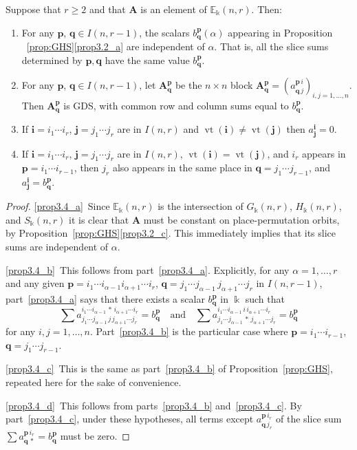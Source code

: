 \documentclass[ALCO,ThmDefs,Unicode,epreuves]{cedram}
\DeclareMathOperator{\vt}{vt}
\newcommand{\E}{\mathbb{E}}
\newcommand{\bi}{{\boldsymbol{i}}} %
\newcommand{\bj}{{\boldsymbol{j}}}
\newcommand{\bp}{{\boldsymbol{p}}}
\newcommand{\bq}{{\boldsymbol{q}}}
\newcommand{\qand}{\quad\text{and}\quad}
\newcommand{\bA}{\mathbf{A}}
\begin{document}
\begin{prop}\label{prop:inv-properties}
 Suppose that $r \ge 2$ and that $\bA$ is an element of
 $\E_\Bbbk(n,r)$. Then:
 \begin{enumerate}[label=(\alph*)]
 \item\label{prop3.4_a} For any $\bp$, $\bq \in I(n,r-1)$, the scalars
 $b^\bp_\bq(\alpha)$ appearing in Proposition
~\ref{prop:GHS}\ref{prop3.2_a} are
 independent of $\alpha$. That is, all the slice sums determined by
 $\bp, \bq$ have the same value $b^\bp_\bq$.
 \item\label{prop3.4_b} For any $\bp$, $\bq \in I(n,r-1)$, let $\bA^\bp_\bq$ be the $n
 \times n$ block $\bA^\bp_\bq = (a^{\bp\, i}_{\bq\, j})_{i,j = 1,
 \dots, n}$. Then $\bA^\bp_\bq$ is GDS, with common row and
 column sums equal to $b^\bp_\bq$.
 \item\label{prop3.4_c} If $\bi = i_1 \cdots i_r$, $\bj = j_1 \cdots j_r$ are in
 $I(n,r)$ and $\vt(\bi) \ne \vt(\bj)$ then $a^\bi_\bj = 0$.
 \item\label{prop3.4_d} If $\bi = i_1 \cdots i_r$, $\bj = j_1 \cdots j_r$ are in
 $I(n,r)$, $\vt(\bi) = \vt(\bj)$, and $i_r$ appears in $\bp = i_1
 \cdots i_{r-1}$, then $j_r$ also appears in the same place in $\bq
 = j_1 \cdots j_{r-1}$, and $a^\bi_\bj = b^\bp_\bq$.
 \end{enumerate}
\end{prop}

\begin{proof}
\ref{prop3.4_a}~Since $\E_\Bbbk(n,r)$ is the intersection of $G_\Bbbk(n,r)$,
$H_\Bbbk(n,r)$, and $S_\Bbbk(n,r)$ it is clear that $\bA$ must be
constant on place-permutation orbits, by Proposition~\ref{prop:GHS}\ref{prop3.2_c}. This immediately implies that its slice sums are
independent of $\alpha$.

\ref{prop3.4_b}~This follows from part~\ref{prop3.4_a}. Explicitly, for any $\alpha = 1,
\dots, r$ and any given $\bp = i_1 \cdots i_{\alpha-1} i_{\alpha+1}
\cdots i_r$, $\bq = j_1 \cdots j_{\alpha-1} \, j_{\alpha+1} \cdots
j_r$ in $I(n,r-1)$, part~\ref{prop3.4_a} says that there exists a scalar
$b^\bp_\bq$ in $\Bbbk$ such that
\[
\sum a^{i_1\cdots i_{\alpha-1} \,*\, i_{\alpha+1}\cdots
 i_r}_{j_1\cdots j_{\alpha-1} \, j \, j_{\alpha+1}\cdots j_r} =
b^\bp_\bq \qand \sum a^{i_1\cdots i_{\alpha-1} \, i \,
 i_{\alpha+1}\cdots i_r}_{j_1\cdots j_{\alpha-1} \,*\,
 j_{\alpha+1}\cdots j_r} = b^\bp_\bq
\]
for any $i,j = 1, \dots, n$. Part~\ref{prop3.4_b} is the particular case where
$\bp = i_1 \cdots i_{r-1}$, $\bq = j_1 \cdots j_{r-1}$.

\ref{prop3.4_c}~This is the same as part~\ref{prop3.4_b} of Proposition~\ref{prop:GHS}, repeated
here for the sake of convenience.

\ref{prop3.4_d}~This follows from parts~\ref{prop3.4_b} and~\ref{prop3.4_c}. By part~\ref{prop3.4_c}, under these hypotheses, all terms except $a^{\bp\,i_r}_{\bq\,j_r}$ of the slice
sum $\sum a^{\bp\,i_r}_{\bq\,*} = b^{\bp}_{\bq}$ must be zero.
\end{proof}
\end{document}
